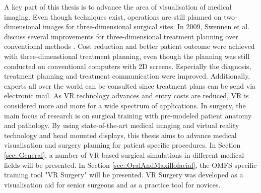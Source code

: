 A key part of this thesis is to advance the area of visualisation of medical imaging.
Even though techniques exist, operations are still planned on two-dimensional images for three-dimensional surgical sites.
In 2009, Swennen et al. discuss several improvements for three-dimensional treatment planning over conventional methods \cite{swennen2009three}.
Cost reduction and better patient outcome were achieved with three-dimenstional treatment planning, even though the planning was still conducted on conventional computers with 2D screens.
Especially the diagnosis, treatment planning and treatment communication were improved.
Additionally, experts all over the world can be consulted since treatment plans can be send via electronic mail.
As VR technology advances and entry costs are reduced, VR is considered more and more for a wide spectrum of applications.
In surgery, the main focus of research is on surgical training with pre-modeled patient anatomy and pathology.
By using state-of-the-art medical imaging and virtual reality technology and head mounted displays, this thesis aims to advance medical visualisation and surgery planning for patient specific procedures.
In Section \ref{sec::General}, a number of VR-based surgical simulations in different medical fields will be presented.
In Section \ref{sec::OralAndMaxillofacial}, the OMFS specific training tool "VR Surgery" will be presented.
VR Surgery was developed as a visualisation aid for senior surgeons and as a practice tool for novices.

